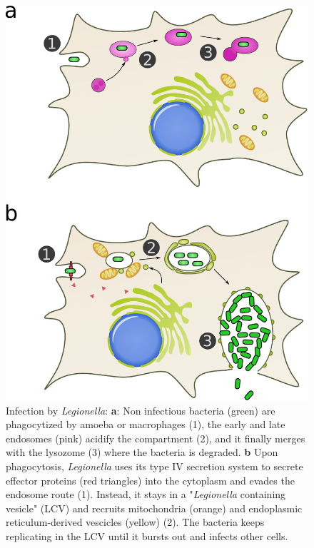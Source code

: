 \begin{figure}[b]
    \includegraphics[width=\textwidth]{Parts/Part01/gfx/legionella_life_cycle.pdf}
    \caption{Infection by \textit{Legionella}: \textbf{a}: Non infectious bacteria (green) are phagocytized by amoeba or macrophages (1), the early and late endosomes (pink) acidify the compartment (2), and it finally merges with the lysozome (3) where the bacteria is degraded. \textbf{b} Upon phagocytosis, \textit{Legionella} uses its type IV secretion system to secrete effector proteins (red triangles) into the cytoplasm and evades the endosome route (1). Instead, it stays in a "\textit{Legionella} containing vesicle" (LCV) and recruits mitochondria (orange) and endoplasmic reticulum-derived vescicles (yellow) (2). The bacteria keeps replicating in the LCV until it bursts out and infects other cells.}
	\label{fig:01-01:legionella}
\end{figure}

